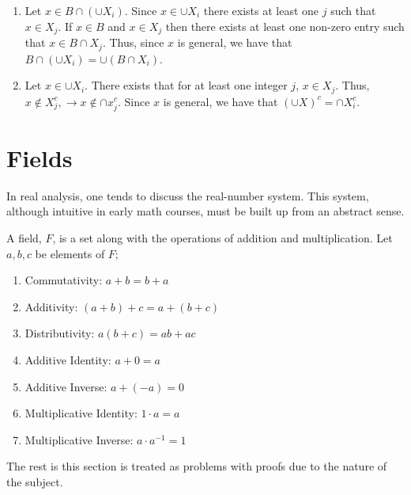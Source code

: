 \begin{solution}
    \begin{enumerate}[label=\arabic{*}.]
        \item Let $x\in B \cap (\cup X_i)$. Since $x\in \cup X_i$ there exists at least one $j$ such that $x\in X_j$. If $x\in B$ and $x\in X_j$ then there exists at least one non-zero entry such that $x\in B\cap X_j$. Thus, since $x$ is general, we have that $B \cap (\cup X_i) = \cup (B\cap X_i)$.
        
        \item Let $x\in \cup X_i$. There exists that for at least one integer $j$, $x\in X_j$. Thus, $x \notin X_j^c, \rightarrow x\notin \cap x_j^c$. Since $x$ is general, we have that $(\cup X)^c = \cap X_{i}^c$.
    \end{enumerate}
\end{solution}




\clearpage

\section{Fields}

In real analysis, one tends to discuss the real-number system. This system, although intuitive in early math courses, must be built up from an abstract sense.

\begin{definition}
    A field, $F$, is a set along with the operations of addition and multiplication. Let $a,b,c$ be elements of $F$;
    \begin{enumerate}
        \item Commutativity: $a + b = b + a$
        \item Additivity: $(a + b) + c = a + (b + c)$
        \item Distributivity: $a(b + c) = ab + ac$
        \item Additive Identity: $a + 0 = a$
        \item Additive Inverse: $a + (-a) = 0$
        \item Multiplicative Identity: $1\cdot a  = a$
        \item Multiplicative Inverse: $a \cdot a^{-1} = 1$ 
    \end{enumerate}
\end{definition}

The rest is this section is treated as problems with proofs due to the nature of the subject.

